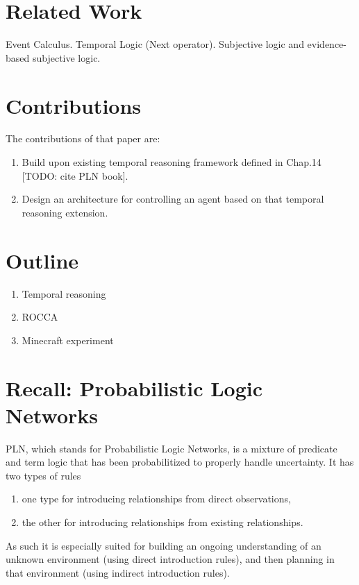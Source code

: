 \documentclass[runningheads]{llncs}
\begin{document}
\section{Related Work}

Event Calculus.  Temporal Logic (Next operator).  Subjective logic and
evidence-based subjective logic.

\section{Contributions}

The contributions of that paper are:
\begin{enumerate}
\item Build upon existing temporal reasoning framework defined in
  Chap.14 [TODO: cite PLN book].
\item Design an architecture for controlling an agent based on that
  temporal reasoning extension.
\end{enumerate}

\section{Outline}

\begin{enumerate}
\item Temporal reasoning
\item ROCCA
\item Minecraft experiment
\end{enumerate}

\section{Recall: Probabilistic Logic Networks}

PLN, which stands for Probabilistic Logic Networks, is a mixture of
predicate and term logic that has been probabilitized to properly
handle uncertainty.  It has two types of rules
\begin{enumerate}
\item one type for introducing relationships from direct observations,
\item the other for introducing relationships from existing
  relationships.
\end{enumerate}
As such it is especially suited for building an ongoing understanding
of an unknown environment (using direct introduction rules), and then
planning in that environment (using indirect introduction rules).
\end{document}
